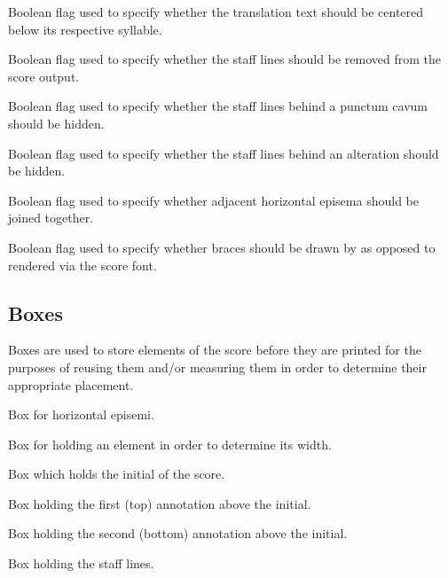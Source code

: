 Boolean flag used to specify whether the translation text should be centered below its respective syllable.

Boolean flag used to specify whether the staff lines should be removed from the score output.

Boolean flag used to specify whether the staff lines behind a punctum cavum should be hidden.

Boolean flag used to specify whether the staff lines behind an alteration should be hidden.

Boolean flag used to specify whether adjacent horizontal episema should be joined together.

Boolean flag used to specify whether braces should be drawn by \MP{} as
opposed to rendered via the score font.

\subsection{Boxes}

Boxes are used to store elements of the score before they are printed for the purposes of reusing them and/or measuring them in order to determine their appropriate placement.

Box for horizontal episemi.

Box for holding an element in order to determine its width.

Box which holds the initial of the score.

Box holding the first (top) annotation above the initial.

Box holding the second (bottom) annotation above the initial.

Box holding the staff lines.

